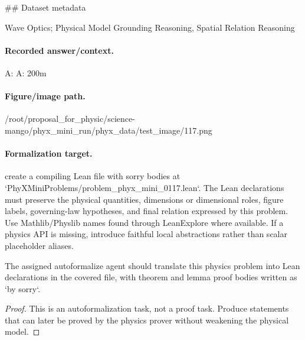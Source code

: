 \#\# Dataset metadata

Wave Optics; Physical Model Grounding Reasoning, Spatial Relation Reasoning

\paragraph{Recorded answer/context.}
A: A: 200m

\paragraph{Figure/image path.}
/root/proposal\_for\_physic/science-mango/phyx\_mini\_run/phyx\_data/test\_image/117.png

\paragraph{Formalization target.}
create a compiling Lean file with sorry bodies at `PhyXMiniProblems/problem\_phyx\_mini\_0117.lean`. The Lean declarations must preserve the physical quantities, dimensions or dimensional roles, figure labels, governing-law hypotheses, and final relation expressed by this problem.
Use Mathlib/Physlib names found through LeanExplore where available. If a physics API is missing, introduce faithful local abstractions rather than scalar placeholder aliases.

\begin{theorem}
\label{thm:physics:phyx_mini_0117:target}
The assigned autoformalize agent should translate this physics problem into Lean declarations in the covered file, with theorem and lemma proof bodies written as `by sorry`.
\end{theorem}
\begin{proof}
This is an autoformalization task, not a proof task. Produce statements that can later be proved by the physics prover without weakening the physical model.
\end{proof}

